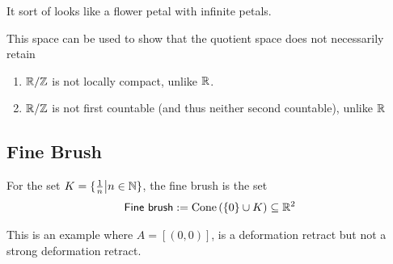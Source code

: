 It sort of looks like a flower petal with infinite petals.

This space can be used to show that the quotient space does not necessarily retain
\begin{enumerate}
  \item $\mathbb{R}/\mathbb{Z}$ is not locally compact, unlike $\mathbb{R}$.
  \item $\mathbb{R}/\mathbb{Z}$ is not first countable (and thus neither second countable), unlike $\mathbb{R}$
\end{enumerate}


\subsection*{Fine Brush}

For the set $K = \{\tfrac{1}{n} \big\vert n \in \mathbb{N}\}$, the fine brush is the set
\begin{align*}
  \textsf{Fine brush} := \text{Cone}\left(
    \{0\} \cup K
  \right) \subseteq \mathbb{R}^{2}
\end{align*}

This is an example where $A = [(0,0)]$, is a deformation retract but not a strong deformation retract.


